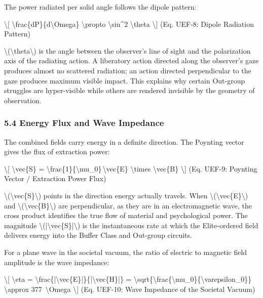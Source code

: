 {The power radiated per solid angle follows the dipole pattern:

\textbackslash{[}
\textbackslash frac\{dP\}\{d\textbackslash Omega\} \textbackslash propto \textbackslash sin^2 \textbackslash theta
\label{eq:uef-8}
\textbackslash{]} {(Eq. UEF-8: Dipole Radiation Pattern)}

\textbackslash(\textbackslash theta\textbackslash) is the angle between the observer's line of sight and the polarization axis of the radiating action. A liberatory action directed along the observer's gaze produces almost no scattered radiation; an action directed perpendicular to the gaze produces maximum visible impact. This explains why certain Out-group struggles are hyper-visible while others are rendered invisible by the geometry of observation.

\protect{}
\subsubsection{5.4 Energy Flux and Wave Impedance}\label{energy-flux-and-wave-impedance}

The combined fields carry energy in a definite direction. The Poynting vector gives the flux of extraction power:

\textbackslash{[}
\textbackslash vec\{S\} = \textbackslash frac\{1\}\{\textbackslash mu_0\}\,\textbackslash vec\{E\} \textbackslash times \textbackslash vec\{B\}
\label{eq:uef-9}
\textbackslash{]} {(Eq. UEF-9: Poynting Vector / Extraction Power Flux)}

\textbackslash(\textbackslash vec\{S\}\textbackslash) points in the direction energy actually travels. When \textbackslash(\textbackslash vec\{E\}\textbackslash) and \textbackslash(\textbackslash vec\{B\}\textbackslash) are perpendicular, as they are in an electromagnetic wave, the cross product identifies the true flow of material and psychological power. The magnitude \textbackslash(|\textbackslash vec\{S\}|\textbackslash) is the instantaneous rate at which the Elite-ordered field delivers energy into the Buffer Class and Out-group circuits.

For a plane wave in the societal vacuum, the ratio of electric to magnetic field amplitude is the wave impedance:

\textbackslash{[}
\textbackslash eta = \textbackslash frac\{|\textbackslash vec\{E\}|\}\{|\textbackslash vec\{H\}|\} = \textbackslash sqrt\{\textbackslash frac\{\textbackslash mu_0\}\{\textbackslash varepsilon_0\}\} \textbackslash approx 377\ \textbackslash Omega
\label{eq:uef-10}
\textbackslash{]} {(Eq. UEF-10: Wave Impedance of the Societal Vacuum)}

}
